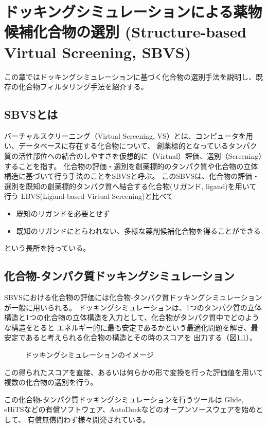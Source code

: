 \chapter{ドッキングシミュレーションによる薬物候補化合物の選別 (Structure-based Virtual Screening, SBVS)}
この章ではドッキングシミュレーションに基づく化合物の選別手法を説明し、既存の化合物フィルタリング手法を紹介する。

\section{SBVSとは}
バーチャルスクリーニング（Virtual Screening, VS）とは、コンピュータを用い、データベースに存在する化合物について、
創薬標的となっているタンパク質の活性部位への結合のしやすさを仮想的に（Virtual）評価、選別（Screening）することを指す。
化合物の評価・選別を創薬標的のタンパク質や化合物の立体構造に基づいて行う手法のことをSBVSと呼ぶ。
このSBVSは、化合物の評価・選別を既知の創薬標的タンパク質へ結合する化合物(リガンド, ligand)を用いて行う
LBVS(Ligand-based Virtual Screening)と比べて
\begin{itemize}
\item 既知のリガンドを必要とせず
\item 既知のリガンドにとらわれない、多様な薬剤候補化合物を得ることができる
\end{itemize}
という長所を持っている。

\section{化合物-タンパク質ドッキングシミュレーション}
SBVSにおける化合物の評価には化合物-タンパク質ドッキングシミュレーションが一般に用いられる。
ドッキングシミュレーションは、1つのタンパク質の立体構造と1つの化合物の立体構造を入力として、化合物がタンパク質中でどのような構造をとると
エネルギー的に最も安定であるかという最適化問題を解き、最安定であると考えられる化合物の構造とその時のスコアを
出力する（図\ref{fig:docking}）。
\begin{figure}[tb]
 \begin{center}
  \caption{ドッキングシミュレーションのイメージ}
  \label{fig:docking}
 \end{center}
\end{figure}
この得られたスコアを直接、あるいは何らかの形で変換を行った評価値を用いて複数の化合物の選別を行う。

この化合物-タンパク質ドッキングシミュレーションを行うツールは
Glide\cite{Friesner2004}, eHiTS\citetodo{}などの有償ソフトウェア、AutoDock\citetodo{}などのオープンソースウェアを始めとして、
有償無償問わず様々開発されている。

